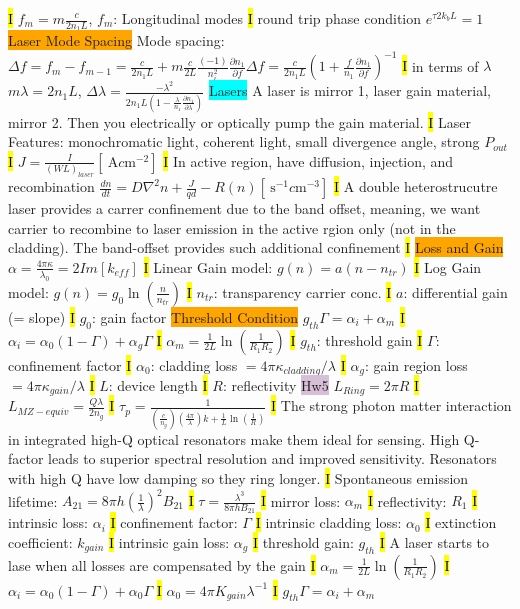 \documentclass[fontsize=3]{scrartcl}
\begin{document}
\hl{I}
$f_m = m\frac{c}{2n_1 L}$, $f_m$: Longitudinal modes
\hl{I}
round trip phase condition $e^{\tau 2 k_{b} L} = 1$
\colorbox{Orange}{Laser Mode Spacing}
Mode spacing: $\Delta f = f_{m} - f_{m-1} = \frac{c}{2n_1 L} + m \frac{c}{2L}\frac{(-1)}{n_i^2}\frac{\partial n_1}{\partial f} \Delta f = \frac{c}{2n_1 L}(1+\frac{f}{n_1}\frac{\partial n_1}{\partial f} )^{-1}$
\hl{I}
in terms of $\lambda$
$m \lambda = 2 n_1 L$, $\Delta \lambda = \frac{-\lambda^2}{2n_1 L (1-\frac{\lambda}{n_1} \frac{\partial n_1}{\partial \lambda})}$
\colorbox{Cyan}{Lasers}
A laser is mirror 1, laser gain material, mirror 2. Then you electrically or optically pump the gain material. 
\hl{I}
Laser Features: monochromatic light, coherent light, small divergence angle, strong $P_{out}$
\hl{I}
$J = \frac{I}{(WL)_{laser}} [\SI{}{ \ampere c\meter^{-2} }]$ 
\hl{I}
In active region, have diffusion, injection, and recombination $\frac{d n}{dt} = D\nabla^2 n + \frac{J}{qd} - R(n) [\SI{}{ \second^{-1} c\meter^{-3} }]$
\hl{I}
A double heterostrucutre laser provides a carrer confinement due to the band offset, meaning, we want carrier to recombine to laser emission in the active rgion only (not in the cladding). The band-offset provides such additional confinement
\hl{I}
\colorbox{Orange}{Loss and Gain}
$\alpha = \frac{4\pi \kappa}{\lambda_0} = 2 Im[k_{eff}]$
\hl{I}
Linear Gain model: $g(n) = a(n-n_{tr})$
\hl{I}
Log Gain model: $g(n) = g_0 \ln (\frac{n}{n_{tr}})$
\hl{I}
$n_{tr}$: transparency carrier conc.
\hl{I}
$a$: differential gain (= slope)
\hl{I}
$g_0$: gain factor
\colorbox{Orange}{Threshold Condition}
$g_{th} \Gamma = \alpha_{i} + \alpha_{m}$
\hl{I}
$\alpha_i = \alpha_0(1 - \Gamma) + \alpha_g \Gamma$
\hl{I}
$\alpha_{m} = \frac{1}{2L} \ln(\frac{1}{R_1R_2})$
\hl{I}
$g_{th}$: threshold gain
\hl{I}
$\Gamma$: confinement factor
\hl{I}
$\alpha_0$: cladding loss $= 4 \pi \kappa_{cladding} / \lambda$
\hl{I}
$\alpha_g$: gain region loss $= 4 \pi \kappa_{gain} / \lambda$
\hl{I}
$L$: device length
\hl{I}
$R$: reflectivity 
\colorbox{Thistle}{Hw5}
$L_{Ring} = 2\pi R$
\hl{I}
$L_{MZ-equiv} = \frac{Q \lambda}{2 n_g}$
\hl{I}
$\tau_{p} = \frac{1}{(\frac{c}{n_g})(\frac{4\pi}{\lambda})k + \frac{1}{L} \ln (\frac{1}{R})}$
\hl{I}
The strong photon matter interaction in integrated high-Q optical resonators make them ideal for sensing. High Q- factor leads to superior spectral resolution and improved sensitivity. Resonators with high Q have low damping so they ring longer. 
\hl{I}
Spontaneous emission lifetime: $A_{21} = 8 \pi  h (\frac{1}{\lambda})^2 B_{21}$
\hl{I}
$\tau = \frac{\lambda^3}{8\pi h B_{21}}$
\hl{I}
mirror loss: $\alpha_m$
\hl{I}
reflectivity: $R_1$
\hl{I}
intrinsic loss: $\alpha_{i}$
\hl{I}
confinement factor: $\Gamma$
\hl{I}
intrinsic cladding loss: $\alpha_0$
\hl{I}
extinction coefficient: $k_{gain}$
\hl{I}
intrinsic gain loss: $\alpha_{g}$
\hl{I}
threshold gain: $g_{th}$
\hl{I}
A laser starts to lase when all losses are compensated by the gain
\hl{I}
$\alpha_{m} = \frac{1}{2L} \ln (\frac{1}{R_1 R_2})$
\hl{I} 
$\alpha_{i} =  \alpha_0 (1-\Gamma) + \alpha_0 \Gamma$
\hl{I}
$\alpha_0 = 4 \pi K_{gain} \lambda^{-1}$
\hl{I}
$g_{th} \Gamma = \alpha_i + \alpha_m$
\end{document}
